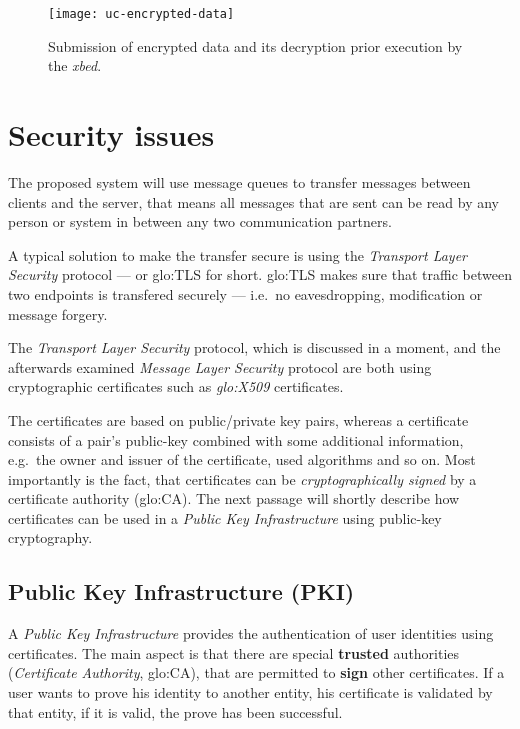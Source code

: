 \begin{figure}[h!]
  \begin{center}
    \texttt{[image: uc-encrypted-data]}
  \end{center}
  \caption[UC  Encrypted  Data]{Submission   of  encrypted  data  and  its
    decryption prior execution by the \emph{xbed}.}
  \label{fig:uc-terminate-task}
\end{figure}

\section{Security issues}
\label{sec:security-requirements}

The proposed system  will use message queues to  transfer messages between
clients and the server, that means  all messages that are sent can be read
by any person or system in between any two communication partners. 

A   typical  solution   to  make   the  transfer   secure  is   using  the
\emph{Transport Layer  Security} protocol --- or  \gls{glo:TLS} for short.
\gls{glo:TLS} makes sure that  traffic between two endpoints is transfered
securely --- i.e.~no eavesdropping, modification or message forgery.

The  \emph{Transport Layer  Security} protocol,  which is  discussed  in a
moment, and the afterwards examined \emph{Message Layer Security} protocol
are  both using cryptographic  certificates such  as \emph{\gls{glo:X509}}
certificates.

The  certificates  are  based  on  public/private  key  pairs,  whereas  a
certificate consists of a  pair's public-key combined with some additional
information, e.g.~the owner and issuer of the certificate, used algorithms
and  so  on.  Most  importantly  is the  fact,  that  certificates can  be
\emph{cryptographically    signed}     by    a    certificate    authority
(\gls{glo:CA}). The  next passage  will shortly describe  how certificates
can  be  used  in  a  \emph{Public Key  Infrastructure}  using  public-key
cryptography.

\subsection{Public Key Infrastructure (PKI)}

A  \emph{Public Key  Infrastructure} provides  the authentication  of user
identities using certificates.  The main  aspect is that there are special
\textbf{trusted} authorities (\emph{Certificate Authority}, \gls{glo:CA}),
that are permitted  to \textbf{sign} other certificates.  If  a user wants
to prove his  identity to another entity, his  certificate is validated by
that entity, if it is valid, the prove has been successful.

